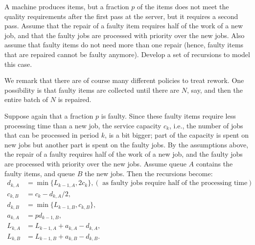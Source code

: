 \begin{extra}[Rework] \label{ex:52}

  A machine produces items, but a fraction $p$ of the items does not meet the quality requirements after the first pass at the server, but it requires a second pass.
  Assume that the repair of a faulty item requires half of the work of a new job, and that the faulty jobs are processed with priority over the new jobs.
  Also assume that faulty items do not need more than one repair (hence, faulty items that are repaired cannot be faulty anymore).
  Develop a set of recursions to model this case.


  We remark that there are of course many different policies to treat rework.
  One possibility is that faulty items are collected until there are $N$, say, and then the entire batch of $N$ is repaired.
  \begin{solution}
    Suppose again that a fraction $p$ is faulty. Since these faulty
    items require less processing time than a new job, the service
    capacity $c_k$, i.e., the number of jobs that can be processed in
    period $k$, is a bit bigger; part of the capacity is spent on new
    jobs but another part is spent on the faulty jobs. By the
    assumptions above, the repair of a faulty requires half of the
    work of a new job, and the faulty jobs are processed with priority
    over the new jobs. Assume queue $A$ contains the faulty items, and
    queue $B$ the new jobs. Then the recursions become:
\begin{equation*}
  \begin{split}
    d_{k,A} &= \min\{L_{k-1, A}, 2c_k\}, (\text{ as faulty jobs require half of the processing time})\\
    c_{k,B} &= c_k - d_{k,A}/2, \\
    d_{k,B} &= \min\{L_{k-1, B}, c_{k,B}\}, \\
    a_{k,A} &= p d_{k-1, B}, \\
    L_{k,A} &= L_{k-1, A} + a_{k,A} - d_{k,A}, \\
    L_{k,B} &= L_{k-1, B} + a_{k,B} - d_{k,B}.
  \end{split}
\end{equation*}
  \end{solution}
\end{extra}



